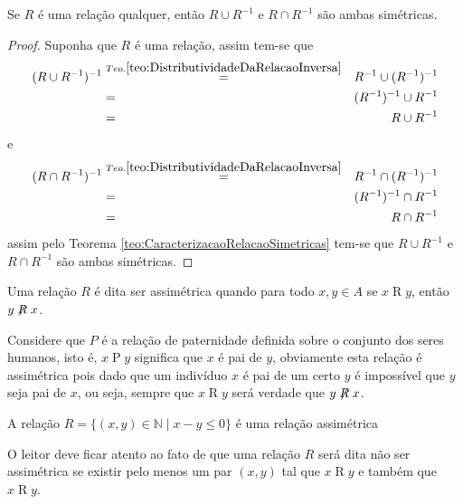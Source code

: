 \begin{teorema}
	Se $R$ é uma relação qualquer, então $R \cup R^{-1}$ e  $R \cap R^{-1}$ são ambas simétricas.
\end{teorema}

\begin{proof}
	Suponha que $R$ é uma relação, assim tem-se que 
	\begin{eqnarray*}
		(R \cup R^{-1})^{-1} & \stackrel{Teo. \ref{teo:DistributividadeDaRelacaoInversa}}{=} & R^{-1} \cup (R^{-1})^{-1}\\
		& = & (R^{-1})^{-1} \cup R^{-1}\\
		&\stackrel{}{=} & R \cup R^{-1}
	\end{eqnarray*}
	e
	\begin{eqnarray*}
		(R \cap R^{-1})^{-1} & \stackrel{Teo. \ref{teo:DistributividadeDaRelacaoInversa}}{=} & R^{-1} \cap (R^{-1})^{-1}\\
		& = & (R^{-1})^{-1} \cap R^{-1}\\
		&\stackrel{}{=} & R \cap R^{-1}
	\end{eqnarray*}
	assim pelo Teorema \ref{teo:CaracterizacaoRelacaoSimetricas} tem-se que $R \cup R^{-1}$ e  $R \cap R^{-1}$ são ambas simétricas.
\end{proof}

\begin{definicao}\label{def:RelacaoAssimétrica}
	Uma relação $R$ é dita ser assimétrica quando para todo $x, y \in A$ se $x \mathrel{R} y$, então $y \centernot{R} x$.
\end{definicao}

\begin{exemplo}
	Considere que $P$ é a relação de paternidade definida sobre o conjunto dos seres humanos, isto é, $x \mathrel{P} y$ significa que $x$ é pai de $y$, obviamente esta relação é assimétrica pois dado que um indivíduo $x$ é pai de um certo $y$ é impossível que $y$ seja pai de $x$, ou seja, sempre que $x \mathrel{R} y$ será verdade que $y \centernot{R} x$.
\end{exemplo}

\begin{exemplo}
	A relação $R = \{(x, y) \in \mathbb{N} \mid x - y \leq 0\}$ é uma relação assimétrica 
\end{exemplo}

O leitor deve ficar atento ao fato de que uma relação $R$ será dita não ser assimétrica se existir pelo menos um par $(x,y)$ tal que $x \mathrel{R} y$ e também que  $x \mathrel{R} y$.

